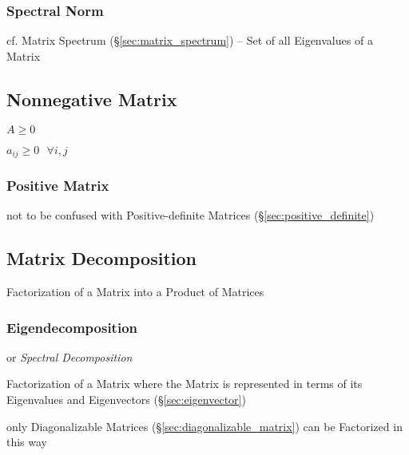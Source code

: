 \subsubsection{Spectral Norm}\label{sec:spectral_norm}

cf. Matrix Spectrum (\S\ref{sec:matrix_spectrum}) -- Set of all Eigenvalues of
a Matrix



\subsection{Nonnegative Matrix}\label{sec:nonnegative_matrix}

$A \geq 0$

$a_{ij} \geq 0 \ \ \ \forall i,j$



\subsubsection{Positive Matrix}\label{sec:positive_matrix}

\fist not to be confused with Positive-definite Matrices
(\S\ref{sec:positive_definite})



\subsection{Matrix Decomposition}\label{sec:matrix_decomposition}

Factorization of a Matrix into a Product of Matrices



\subsubsection{Eigendecomposition}\label{sec:eigendecomposition}

or \emph{Spectral Decomposition}

Factorization of a Matrix where the Matrix is represented in terms of its
Eigenvalues and Eigenvectors (\S\ref{sec:eigenvector})

only Diagonalizable Matrices (\S\ref{sec:diagonalizable_matrix}) can be
Factorized in this way



